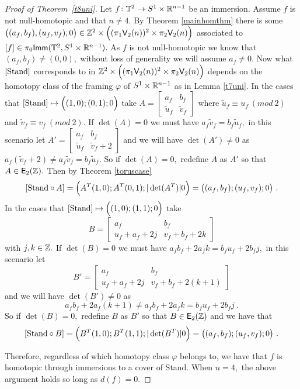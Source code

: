 \begin{proof}[Proof of Theorem~\ref{t8uni}]
Let $f \colon \mathbb T^{2} \rightarrow S^1 \times \mathbb R^{n - 1}$ be an immersion. Assume $f$ is not null-homotopic and that $n \neq 4.$ By Theorem \ref{mainhomthm} there is some $\bigl((a_{f}, b_{f}), (u_{f}, v_{f}), 0\bigr) \in \mathbb Z^{2} \times
\Bigl(
(\pi_1\mathsf V_2(n))^2
\times
\pi_2\mathsf V_2(n)
\Bigr)
$
associated to $[f] \in \pi_{0}{\sf Imm}(\mathbb T^{2}, S^1 \times \mathbb R^{n - 1}).$
As $f$ is not null-homotopic we know that $(a_{f}, b_{f}) \neq (0, 0),$ without loss of generality we will assume $a_{f} \neq 0.$
Now what $[{\rm Stand}]$ corresponds to in $\mathbb Z^{2} \times
\Bigl(
(\pi_1\mathsf V_2(n))^2
\times
\pi_2\mathsf V_2(n)
\Bigr)
$
depends on the homotopy class of the framing $\varphi$ of $ S^1 \times \mathbb R^{n - 1}$ as in Lemma \ref{t7uni}. 
In the cases that $ [{\rm Stand}] \mapsto \Bigl(
(1,0) ; (0,1) ; 0
\Bigr)$ take $A = \begin{bmatrix} a_{f} & b_{f} \\ \tilde{u}_{f} & \tilde{v}_{f} \end{bmatrix}$ where $\tilde{u}_{f} \equiv u_{f}~ (mod~2)$ and $\tilde{v}_{f} \equiv v_{f} ~(mod~2).$  
If $\det(A) = 0$ we must have $a_{f}\tilde{v}_{f} = b_{f}\tilde{u}_{f},$ in this scenario let  $A' = \begin{bmatrix} a_{f} & b_{f} \\ \tilde{u}_{f} & \tilde{v}_{f} + 2\end{bmatrix}$ and we will have $\det(A') \neq 0$ as $a_{f}(\tilde{v}_{f} + 2) \neq a_{f}\tilde{v}_{f} = b_{f}\tilde{u}_{f}.$ So if $\det(A) = 0,$ redefine $A$ as $A'$ so that $A \in {\sf E}_{2}(\mathbb Z).$
Then by Theorem \ref{toruscase} 
\[
[{\rm Stand} \circ A] = \Bigl(
A^{T}(1,0) ; A^{T}(0,1) ; |\det(A^{T})|0
\Bigr) = \bigl((a_{f}, b_{f}); (u_{f}, v_{f}); 0\bigr)~.
\]
In the cases that $ [{\rm Stand}] \mapsto \Bigl(
(1,0) ; (1, 1) ; 0
\Bigr)$ take \[B = \begin{bmatrix} a_{f} & b_{f} \\ u_{f} + a_{f} + 2j & v_{f} + b_{f} +2k \end{bmatrix}\] with $j, k \in \mathbb Z.$ If $\det(B) = 0$ we must have $a_{f}b_{f} + 2a_{f}k = b_{f}u_{f} + 2b_{f}j,$ in this scenario let \[B' = \begin{bmatrix} a_{f} & b_{f} \\ u_{f} + a_{f} + 2j & v_{f} + b_{f} +2(k + 1) \end{bmatrix}\] and we will have $\det(B') \neq 0$ as \[
a_{f}b_{f} + 2a_{f}(k + 1) \neq a_{f}b_{f} + 2a_{f}k = b_{f}u_{f} + 2b_{f}j~.\] So if $\det(B) = 0,$ redefine $B$ as $B'$ so that $B \in {\sf E}_{2}(\mathbb Z)$ and we have that
\[
[{\rm Stand} \circ B] = \Bigl(
B^{T}(1,0) ; B^{T}(1,1) ; |\det(B^{T})|0
\Bigr) = \bigl((a_{f}, b_{f}); (u_{f}, v_{f}); 0\bigr)~.
\]

Therefore, regardless of which homotopy class $\varphi$ belongs to, we have that $f$ is homotopic through immersions to a cover of {\rm Stand}.
When $n = 4,$ the above argument holds so long as $d(f) = 0.$
\end{proof}


